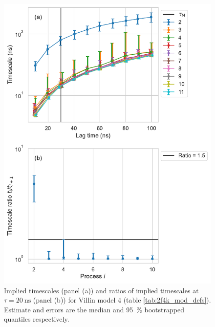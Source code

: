 \documentclass{article}
\begin{document}
\begin{figure}
    \centering
    \includegraphics[height=0.65\textheight]{figures/its/villin/Villin_model_logit(dist.)_method_m3.pdf}
    \caption{Implied timescales (panel (a)) and ratios of implied timescales at $\tau=\SI{20}{\nano\second}$ (panel (b)) for Villin model 4 (table \ref{tab:2f4k_mod_defs}). Estimate and errors are the median and \SI{95}{\percent} bootstrapped quantiles respectively.}
    \label{fig:its_villin_4}
\end{figure}
\end{document}
